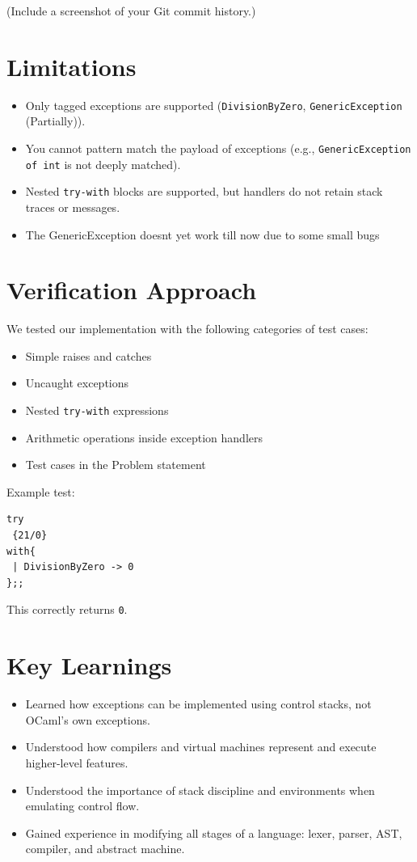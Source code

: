 \documentclass[11pt]{article}
\begin{document}
(Include a screenshot of your Git commit history.)

\section{Limitations}

\begin{itemize}
  \item Only tagged exceptions are supported (\texttt{DivisionByZero}, \texttt{GenericException} (Partially)).
  \item You cannot pattern match the payload of exceptions (e.g., \texttt{GenericException of int} is not deeply matched).
  \item Nested \texttt{try-with} blocks are supported, but handlers do not retain stack traces or messages.
  \item The GenericException doesnt yet work till now due to some small bugs
\end{itemize}

\section{Verification Approach}

We tested our implementation with the following categories of test cases:

\begin{itemize}
  \item Simple raises and catches
  \item Uncaught exceptions
  \item Nested \texttt{try-with} expressions
  \item Arithmetic operations inside exception handlers
  \item Test cases in the Problem statement
\end{itemize}

Example test:

\begin{lstlisting}
try
 {21/0}
with{
 | DivisionByZero -> 0
};;
\end{lstlisting}

This correctly returns \texttt{0}.

\section{Key Learnings}

\begin{itemize}
  \item Learned how exceptions can be implemented using control stacks, not OCaml’s own exceptions.
  \item Understood how compilers and virtual machines represent and execute higher-level features.
  \item Understood the importance of stack discipline and environments when emulating control flow.
  \item Gained experience in modifying all stages of a language: lexer, parser, AST, compiler, and abstract machine.
\end{itemize}
\end{document}
